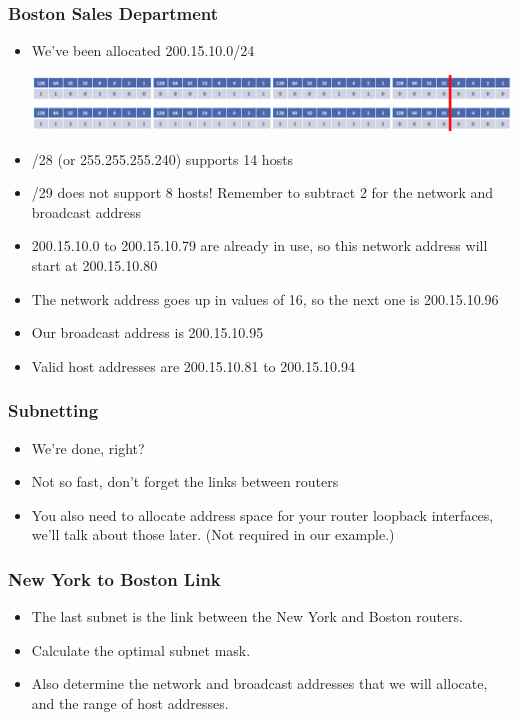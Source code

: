 \documentclass[pdflatex,compress]{beamer}
\begin{document}
\begin{frame}
	\frametitle{Boston Sales Department}
	\begin{itemize}
		\item We’ve been allocated 200.15.10.0/24
		\begin{center}
			\includegraphics[width=0.9\linewidth]{img/img12}
		\end{center}
		\item /28 (or 255.255.255.240) supports 14 hosts
		\item /29 does not support 8 hosts! Remember to subtract 2 for the network and broadcast address
		\item 200.15.10.0 to 200.15.10.79 are already in use, so this network address will start at 200.15.10.80
		\item The network address goes up in values of 16, so the next one is 200.15.10.96
		\item Our broadcast address is 200.15.10.95
		\item Valid host addresses are 200.15.10.81 to 200.15.10.94
	\end{itemize}
\end{frame}

\begin{frame}
	\frametitle{Subnetting}
	\begin{itemize}
		\item We’re done, right?
		\item Not so fast, don’t forget the links between routers
		\item You also need to allocate address space for your router loopback interfaces, we’ll talk about those later. (Not required in our example.)
	\end{itemize}
\end{frame}


\begin{frame}
	\frametitle{New York to Boston Link}
	\begin{itemize}
		\item The last subnet is the link between the New York and Boston routers.
		\item Calculate the optimal subnet mask.
		\item Also determine the network and broadcast addresses that we will allocate, and the range of host addresses.
	\end{itemize}
\end{frame}
\end{document}
